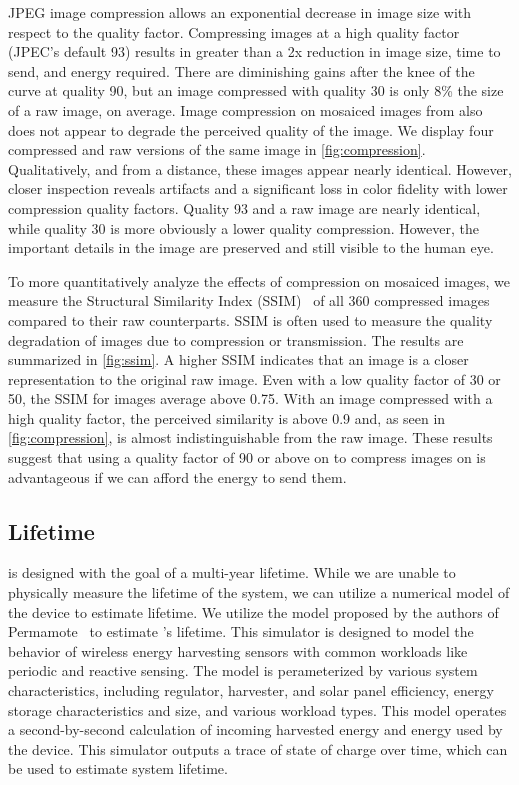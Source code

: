JPEG image compression allows an exponential decrease in image size with respect to the quality factor.
Compressing images at a high quality factor (JPEC's default 93) results in greater than a 2x reduction in image size, time to send, and energy required. There are diminishing gains after the knee of the curve at quality 90, but an image compressed with quality 30 is only 8\% the size of a raw image, on average. Image compression on mosaiced images from \name also does not appear to degrade the perceived quality of the image. We display four compressed and raw versions of the same image in \cref{fig:compression}. Qualitatively, and from a distance, these images appear nearly identical. However, closer inspection reveals artifacts and a significant loss in color fidelity with lower compression quality factors. Quality 93 and a raw image are nearly identical, while quality 30 is more obviously a lower quality compression. However, the important details in the image are preserved and still visible to the human eye.

To more quantitatively analyze the effects of compression on mosaiced images, we measure the Structural Similarity Index (SSIM)~\cite{wang2004image} of all 360 compressed images compared to their raw counterparts. SSIM is often used to measure the quality degradation of images due to compression or transmission. The results are summarized in \cref{fig:ssim}. A higher SSIM indicates that an image is a closer representation to the original raw image.
Even with a low quality factor of 30 or 50, the SSIM for images average above 0.75. With an image compressed with a high quality factor, the perceived similarity is above 0.9 and, as seen in \cref{fig:compression}, is almost indistinguishable from the raw image. These results suggest that using a quality factor of 90 or above on to compress images on \name is advantageous if we can afford the energy to send them.

\subsection{Lifetime}
\name is designed with the goal of a multi-year lifetime. While we are unable to physically measure the lifetime of the system, we can utilize a numerical model of the device to estimate lifetime. We utilize the model proposed by the authors of Permamote~\cite{jackson2019capacity} to estimate \name's lifetime. 
This simulator is designed to model the behavior of wireless energy harvesting sensors with common workloads like periodic and reactive sensing. The model is perameterized by various system characteristics, including regulator, harvester, and solar panel efficiency, energy storage characteristics and size, and various workload types.
This model operates a second-by-second calculation of incoming harvested energy and energy used by the device.
This simulator outputs a trace of state of charge over time, which can be used to estimate system lifetime.

